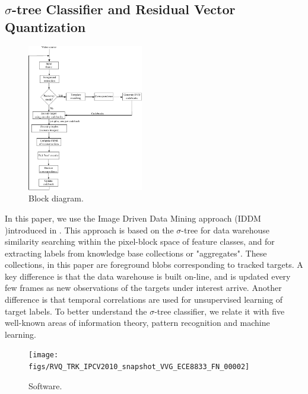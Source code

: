 \documentclass{article}
\begin{document}
\subsection{$\sigma$-tree Classifier and Residual Vector Quantization}
\begin{figure}[t]
	\centering
	\includegraphics[width=0.45\textwidth]{figs/RVQ_TRK_IPCV2010_BlockDiagram}
	\caption{Block diagram.} 	
	\label{fig:block_diagram}	
\end{figure}

In this paper, we use the Image Driven Data Mining approach (IDDM )introduced in \cite{2007_JNL_IDDM_Barnes}.  This approach is based on the $\sigma$-tree for data warehouse similarity searching within the pixel-block space of feature classes, and for extracting labels from knowledge base collections or "aggregates".  These collections, in this paper are foreground blobs corresponding to tracked targets.  A key difference is that the data warehouse is built on-line, and is updated every few frames as new observations of the targets under interest arrive.  Another difference is that temporal correlations are used for unsupervised learning of target labels.  To better understand the $\sigma$-tree classifier, we relate it with five well-known areas of information theory, pattern recognition and machine learning.  

\begin{figure}
	\centering
	\texttt{[image: figs/RVQ\_TRK\_IPCV2010\_snapshot\_VVG\_ECE8833\_FN\_00002]}
	\caption{Software.} 	
	\label{fig:snapshot_VVG}	
\end{figure}
\end{document}
